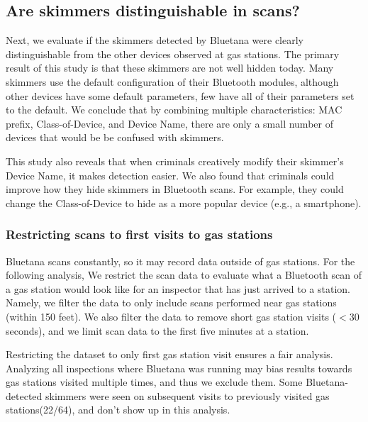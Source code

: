 
\subsection{Are skimmers distinguishable in scans?} %
\label{sec:bluetooth:scans}

Next, we evaluate if 
the skimmers detected by Bluetana were clearly distinguishable from the other devices observed at gas stations. 
%
% 
The primary result of this study is that these skimmers are not
well hidden today.
%
Many skimmers use the default configuration of their Bluetooth
modules, although other devices have some default parameters, few have all of their parameters set to the default.
%
We conclude that by combining multiple characteristics: MAC prefix, Class-of-Device,
and Device Name, there are only a small number of devices that would be be
confused with skimmers.

This study also reveals that when criminals creatively modify their skimmer's
Device Name, it makes detection easier.
%
We also found that criminals could improve how they hide skimmers in Bluetooth
scans.
%
For example, they could change the Class-of-Device to hide as a more popular
device (e.g., a smartphone).

\subsubsection*{Restricting scans to first visits to gas stations}
%
Bluetana scans constantly, so it may record data outside of gas stations.
%
For the following analysis, We restrict the scan data to evaluate what a Bluetooth
scan of a gas station would look like for an inspector that has just arrived to a station.
%
Namely, we filter the
data to only include scans performed near gas stations %
(within 150 feet).
%
%
We also filter the data to remove short gas station visits ($<30$ seconds), and we limit scan data to the first five minutes at a station.

%
Restricting the dataset to only first gas station visit ensures a fair analysis. 
%
Analyzing all inspections where Bluetana was running may bias results towards gas stations visited multiple times, and thus we exclude them. 
%
Some Bluetana-detected skimmers were seen on subsequent visits to previously visited gas stations(22/64), and don't show up in this analysis.
%


